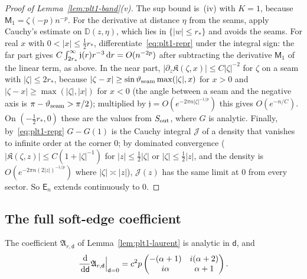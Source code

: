 \begin{proof}[Proof of Lemma~\textup{\ref{lem:plt1-band}(v)}]
The sup bound is~(iv) with $K=1$, because $\mathsf M_1=\zeta(-p)n^{-p}$. For the derivative at distance $\eta$ from the
seams, apply Cauchy's estimate on $\mathbb D(z,\eta)$, which lies in $\{|w|\le r_*\}$ and avoids the seams. For real $x$
with $0<|x|\le\frac12r_*$, differentiate~\eqref{eq:plt1-repr} under the integral sign: the far part gives
$C\int_{2r_*}^\infty\mathfrak j(r)r^{-3}\,\mathrm{d} r=O(n^{-2p})$ after subtracting the derivative $\mathsf M_1$ of the linear term,
as above. In the near part, $|\partial_z\mathfrak K(\zeta,x)|\le C|\zeta|^{-2}$ for $\zeta$ on a seam with $|\zeta|\le2r_*$,
because $|\zeta-x|\ge\sin\vartheta_{\mathrm{seam}}\max(|\zeta|,x)$ for $x>0$ and $|\zeta-x|\ge\max(|\zeta|,|x|)$ for $x<0$ (the angle between a
seam and the negative axis is $\pi-\vartheta_{\mathrm{seam}}>\pi/2$); multiplied by $\mathfrak j=O(e^{-2\pi n|\zeta|^{-1/p}})$ this gives
$O(e^{-n/C})$. On $(-\frac12r_*,0)$ these are the values from $S_{\mathrm{out}}$, where $G$ is analytic. Finally, by~\eqref{eq:plt1-repr}
$G-G(1)$ is the Cauchy integral $\mathcal J$ of a density that vanishes to infinite order at the corner $0$; by dominated
convergence ($|\mathfrak K(\zeta,z)|\le C(1+|\zeta|^{-1})$ for $|z|\le\frac12|\zeta|$ or $|\zeta|\le\frac12|z|$, and the density is
$O(e^{-2\pi n(2|z|)^{-1/p}})$ where $|\zeta|\asymp|z|$), $\mathcal J(z)$ has the same limit at $0$ from every sector. So
$\mathsf E_n$ extends continuously to $0$.
\end{proof}

\subsection{The full soft-edge coefficient}

\begin{lemma}\label{lem:plt1-full}
The coefficient $\mathfrak A_{r,\mathsf d}$ of Lemma~\textup{\ref{lem:plt1-laurent}} is analytic in $\mathsf d$, and
\[
  \frac{\,\mathrm{d}}{\,\mathrm{d}\mathsf d}\mathfrak A_{r,\mathsf d}\Big|_{\mathsf d=0}=c^2p\begin{pmatrix}-(\alpha+1)&i(\alpha+2)\\i\alpha&\alpha+1\end{pmatrix}.
\]
\end{lemma}

